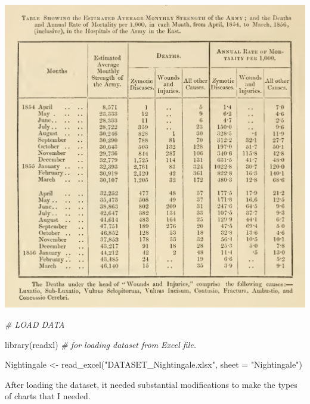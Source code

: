 \documentclass[
  dvipsnames]{article}
\newenvironment{Shaded}{\begin{snugshade}}{\end{snugshade}}
\newcommand{\AttributeTok}[1]{\textcolor[rgb]{0.77,0.63,0.00}{#1}}
\newcommand{\CommentTok}[1]{\textcolor[rgb]{0.56,0.35,0.01}{\textit{#1}}}
\newcommand{\FunctionTok}[1]{\textcolor[rgb]{0.00,0.00,0.00}{#1}}
\newcommand{\NormalTok}[1]{#1}
\newcommand{\OtherTok}[1]{\textcolor[rgb]{0.56,0.35,0.01}{#1}}
\newcommand{\StringTok}[1]{\textcolor[rgb]{0.31,0.60,0.02}{#1}}
\begin{document}
\begin{center}\includegraphics[width=0.8\linewidth]{florence_data_table} \end{center}

\newpage

\begin{Shaded}
\begin{Highlighting}[]
\CommentTok{\# LOAD DATA}

\FunctionTok{library}\NormalTok{(readxl)  }\CommentTok{\# for loading dataset from Excel file.}

\NormalTok{Nightingale }\OtherTok{\textless{}{-}} \FunctionTok{read\_excel}\NormalTok{(}\StringTok{"DATASET\_Nightingale.xlsx"}\NormalTok{,}
    \AttributeTok{sheet =} \StringTok{"Nightingale"}\NormalTok{)}
\end{Highlighting}
\end{Shaded}

After loading the dataset, it needed substantial modifications to make
the types of charts that I needed.
\end{document}
